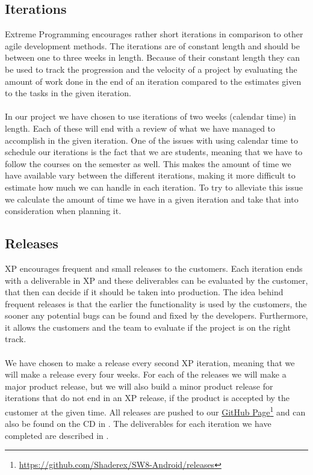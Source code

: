 \subsection{Iterations}
\label{sub:iterations}
Extreme Programming encourages rather short iterations in comparison to other agile development methods. The iterations are of constant length and should be between one to three weeks in length. Because of their constant length they can be used to track the progression and the velocity of a project by evaluating the amount of work done in the end of an iteration compared to the estimates given to the tasks in the given iteration. 
\\\\
In our project we have chosen to use iterations of two weeks (calendar time) in length. Each of these will end with a review of what we have managed to accomplish in the given iteration. One of the issues with using calendar time to schedule our iterations is the fact that we are students, meaning that we have to follow the courses on the semester as well. This makes the amount of time we have available vary between the different iterations, making it more difficult to estimate how much we can handle in each iteration. To try to alleviate this issue we calculate the amount of time we have in a given iteration and take that into consideration when planning it. 

\subsection{Releases}
XP encourages frequent and small releases to the customers. Each iteration ends with a deliverable in XP and these deliverables can be evaluated by the customer, that then can decide if it should be taken into production. The idea behind frequent releases is that the earlier the functionality is used by the customers, the sooner any potential bugs can be found and fixed by the developers. Furthermore, it allows the customers and the team to evaluate if the project is on the right track.
\\\\
We have chosen to make a release every second XP iteration, meaning that we will make a release every four weeks. For each of the releases we will make a major product release, but we will also build a minor product release for iterations that do not end in an XP release, if the product is accepted by the customer at the given time. All releases are pushed to our \href{https://github.com/Shaderex/SW8-Android/releases}{GitHub Page}\footnote{\url{https://github.com/Shaderex/SW8-Android/releases}} and can also be found on the CD in . The deliverables for each iteration we have completed are described in . 

